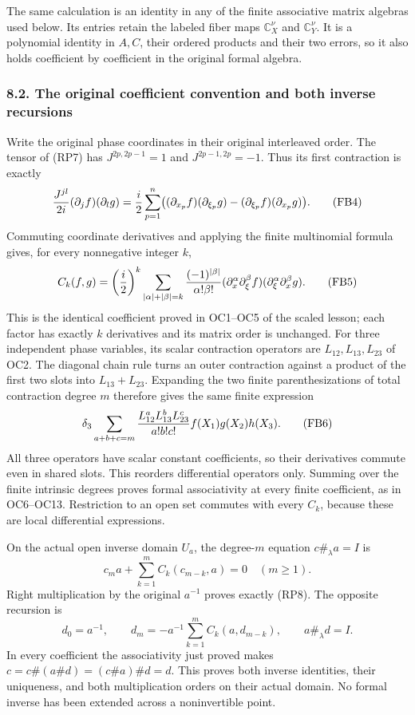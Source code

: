\documentclass[
  11pt,
]{article}
\begin{document}
The same calculation is an identity in any of the finite associative
matrix algebras used below. Its entries retain the labeled fiber maps
\(\mathbb C_X^\nu\) and \(\mathbb C_Y^\nu\). It is a polynomial identity
in \(A,C\), their ordered products and their two errors, so it also
holds coefficient by coefficient in the original formal algebra.

\subsubsection{8.2. The original coefficient convention and both inverse
recursions}\label{the-original-coefficient-convention-and-both-inverse-recursions}

Write the original phase coordinates in their original interleaved
order. The tensor of (RP7) has \(J^{2p,2p-1}=1\) and \(J^{2p-1,2p}=-1\).
Thus its first contraction is exactly \[
 {J^{jl}\over2i}(\partial_jf)(\partial_lg)
 ={i\over2}\sum_{p=1}^n
 \bigl((\partial_{x_p}f)(\partial_{\xi_p}g)
       -(\partial_{\xi_p}f)(\partial_{x_p}g)\bigr).
 \tag{FB4}
\] Commuting coordinate derivatives and applying the finite multinomial
formula gives, for every nonnegative integer \(k\), \[
 C_k(f,g)=\left({i\over2}\right)^k
 \sum_{|\alpha|+|\beta|=k}
 {(-1)^{|\beta|}\over\alpha!\beta!}
 (\partial_x^\alpha\partial_\xi^\beta f)
 (\partial_\xi^\alpha\partial_x^\beta g).
 \tag{FB5}
\] This is the identical coefficient proved in OC1--OC5 of the scaled
lesson; each factor has exactly \(k\) derivatives and its matrix order
is unchanged. For three independent phase variables, its scalar
contraction operators are \(L_{12},L_{13},L_{23}\) of OC2. The diagonal
chain rule turns an outer contraction against a product of the first two
slots into \(L_{13}+L_{23}\). Expanding the two finite parenthesizations
of total contraction degree \(m\) therefore gives the same finite
expression \[
 \delta_3\sum_{a+b+c=m}
 {L_{12}^aL_{13}^bL_{23}^c\over a!b!c!}
       f(X_1)g(X_2)h(X_3).
 \tag{FB6}
\] All three operators have scalar constant coefficients, so their
derivatives commute even in shared slots. This reorders differential
operators only. Summing over the finite intrinsic degrees proves formal
associativity at every finite coefficient, as in OC6--OC13. Restriction
to an open set commutes with every \(C_k\), because these are local
differential expressions.

On the actual open inverse domain \(U_a\), the degree-\(m\) equation
\(c\#_\lambda a=I\) is \[
 c_m a+\sum_{k=1}^mC_k(c_{m-k},a)=0\quad(m\ge1).
 \tag{FB7}
\] Right multiplication by the original \(a^{-1}\) proves exactly (RP8).
The opposite recursion is \[
 d_0=a^{-1},\qquad
 d_m=-a^{-1}\sum_{k=1}^m C_k(a,d_{m-k}),
 \qquad a\#_\lambda d=I.
 \tag{FB8}
\] In every coefficient the associativity just proved makes
\(c=c\#(a\#d)=(c\#a)\#d=d\). This proves both inverse identities, their
uniqueness, and both multiplication orders on their actual domain. No
formal inverse has been extended across a noninvertible point.
\end{document}
